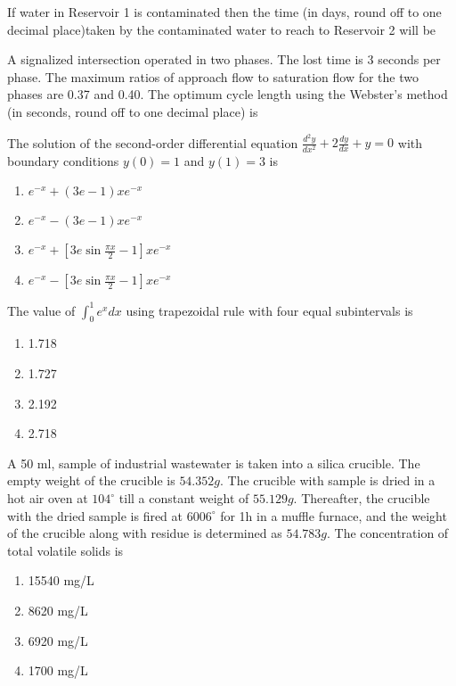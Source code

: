 If water in Reservoir 1 is contaminated then the time (in days, round off to one decimal place)taken by the contaminated water to reach to Reservoir 2 will be \underline{\hspace{1cm}}
\vspace{0.5cm}
\item A signalized intersection operated in two phases. The lost time is 3 seconds per phase. The maximum ratios of approach flow to saturation flow for the two phases are 0.37 and 0.40. The optimum cycle length using the Webster's method (in seconds, round off to one decimal place) is \underline{\hspace{1cm}}
\vspace{0.5cm}
\item The solution of the second-order differential equation $\frac{d^2y}{dx^2}+2\frac{dy}{dx}+y=0$ with boundary conditions $y(0)=1$ and $y(1)=3$ is 
\begin{enumerate}
    \item $e^{-x}+(3e-1)xe^{-x}$
    \item $e^{-x}-(3e-1)xe^{-x}$
    \item $e^{-x}+[3e\sin{\frac{\pi x}{2}}-1]xe^{-x}$
    \item $e^{-x}-[3e\sin{\frac{\pi x}{2}}-1]xe^{-x}$
\end{enumerate}
\item The value of $\int_{0}^1 e^x dx$ using trapezoidal rule with four equal subintervals is 
\begin{enumerate}
    \item 1.718
    \item 1.727
    \item 2.192
    \item 2.718
\end{enumerate}  
\vspace{0.5cm}
\item A 50 ml, sample of industrial wastewater is taken into a silica crucible. The empty weight of the crucible is $54.352g$. The crucible with sample is dried in a hot air oven at $104^\circ$ till a constant weight of $55.129g$. Thereafter, the crucible with the dried sample is fired at $6006^\circ$ for 1h in a muffle furnace, and the weight of the crucible along with residue is determined as $54.783g$. The concentration of total volatile solids is \underline{\hspace{1cm}}
\begin{enumerate}
    \item 15540 mg/L
    \item  8620 mg/L
    \item 6920 mg/L
    \item 1700 mg/L
\end{enumerate}
